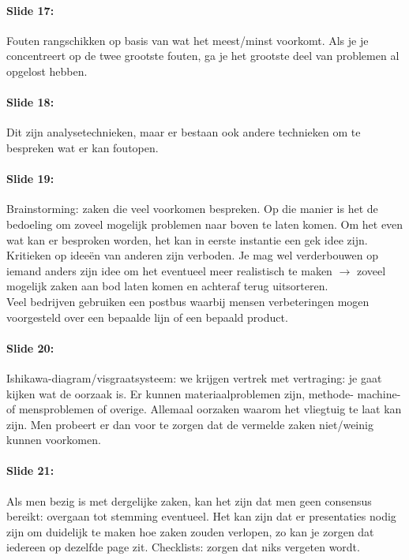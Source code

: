 \documentclass[10pt,a4paper]{report}
\begin{document}
\paragraph{Slide 17:} Fouten rangschikken op basis van wat het meest/minst voorkomt. Als je je concentreert op de twee grootste fouten, ga je het grootste deel van problemen al opgelost hebben.

\paragraph{Slide 18:} Dit zijn analysetechnieken, maar er bestaan ook andere technieken om te bespreken wat er kan foutopen.

\paragraph{Slide 19:} Brainstorming: zaken die veel voorkomen bespreken. Op die manier is het de bedoeling om zoveel mogelijk problemen naar boven te laten komen. Om het even wat kan er besproken worden, het kan in eerste instantie een gek idee zijn.\\
Kritieken op idee\"en van anderen zijn verboden. Je mag wel verderbouwen op iemand anders zijn idee om het eventueel meer realistisch te maken $\rightarrow$ zoveel mogelijk zaken aan bod laten komen en achteraf terug uitsorteren.\\
Veel bedrijven gebruiken een postbus waarbij mensen verbeteringen mogen voorgesteld over een bepaalde lijn of een bepaald product. 

\paragraph{Slide 20:} Ishikawa-diagram/visgraatsysteem: we krijgen vertrek met vertraging: je gaat kijken wat de oorzaak is. Er kunnen materiaalproblemen zijn, methode- machine- of mensproblemen of overige. Allemaal oorzaken waarom het vliegtuig te laat kan zijn. Men probeert er dan voor te zorgen dat de vermelde zaken niet/weinig kunnen voorkomen.

\paragraph{Slide 21:} Als men bezig is met dergelijke zaken, kan het zijn dat men geen consensus bereikt: overgaan tot stemming eventueel. Het kan zijn dat er presentaties nodig zijn om duidelijk te maken hoe zaken zouden verlopen, zo kan je zorgen dat iedereen op dezelfde page zit.
Checklists: zorgen dat niks vergeten wordt.
\end{document}
